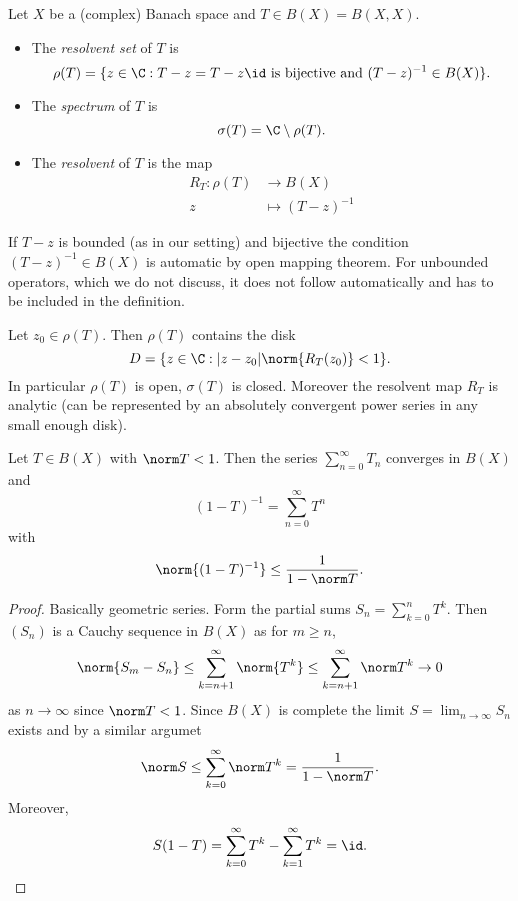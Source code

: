 \documentclass[a4paper]{article}
\begin{document}
\begin{definition}
  Let \(X\) be a (complex) Banach space and \(T \in B(X) = B(X, X)\).
  \begin{itemize}
  \item The \emph{resolvent set} of \(T\) is
    \[
      \rho(T) = \{z \in \C: T - z = T - z \id \text{ is bijective and } (T - z)^{-1} \in B(X)\}.
    \]
  \item The \emph{spectrum} of \(T\) is
    \[
      \sigma(T) = \C \setminus \rho(T).
    \]
  \item The \emph{resolvent} of \(T\) is the map
    \begin{align*}
      R_T: \rho(T) &\to B(X) \\
      z &\mapsto (T - z)^{-1}
    \end{align*}
  \end{itemize}
\end{definition}

\begin{remark}
  If \(T - z\) is bounded (as in our setting) and bijective the condition \((T - z)^{-1} \in B(X)\) is automatic by open mapping theorem. For unbounded operators, which we do not discuss, it does not follow automatically and has to be included in the definition.
\end{remark}

\begin{proposition}
  \label{prop:openness of resolvent set}
  Let \(z_0 \in \rho(T)\). Then \(\rho(T)\) contains the disk
  \[
    D = \{z \in \C: |z - z_0| \norm{R_T(z_0)} < 1\}.
  \]
  In particular \(\rho(T)\) is open, \(\sigma(T)\) is closed. Moreover the resolvent map \(R_T\) is analytic (can be represented by an absolutely convergent power series in any small enough disk).
\end{proposition}

\begin{lemma}
  Let \(T\in B(X)\) with \(\norm T < 1\). Then the series \(\sum_{n = 0}^\infty T_n\) converges in \(B(X)\) and
  \[
    (1 - T)^{-1} = \sum_{n = 0}^\infty T^n
  \]
  with
  \[
    \norm{(1 - T)^{-1}} \leq \frac{1}{1 - \norm T}.
  \]
\end{lemma}

\begin{proof}
  Basically geometric series. Form the partial sums \(S_n = \sum_{k = 0}^n T^k\). Then \((S_n)\) is a Cauchy sequence in \(B(X)\) as for \(m \geq n\),
  \[
    \norm{S_m - S_n}
    \leq \sum_{k = n + 1}^\infty \norm{T^k}
    \leq \sum_{k = n + 1}^\infty \norm T^k
    \to 0
  \]
  as \(n \to \infty\) since \(\norm T < 1\). Since \(B(X)\) is complete the limit \(S = \lim_{n \to \infty} S_n\) exists and by a similar argumet
  \[
    \norm S
    \leq \sum_{k = 0}^\infty \norm T^k
    = \frac{1}{1 - \norm T}.
  \]
  Moreover,
  \[
    S(1 - T)
    = \sum_{k = 0}^\infty T^k - \sum_{k = 1}^\infty T^k
    = \id.
  \]
\end{proof}
\end{document}
